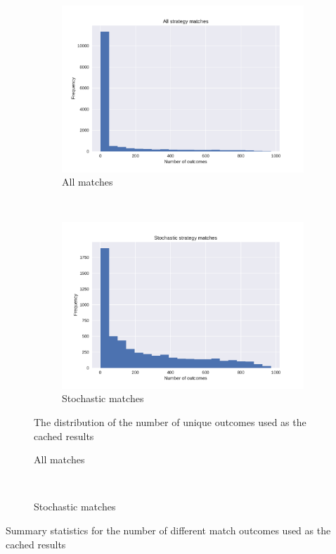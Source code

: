 \documentclass{article}
\begin{document}
\begin{figure}[!hbtp]
    \centering
    \begin{subfigure}[t]{.5\textwidth}
        \centering
        \includegraphics[width=.9\textwidth]{../img/number_of_match_outcomes.pdf}
        \caption{All matches}
    \end{subfigure}%
    ~
    \begin{subfigure}[t]{.5\textwidth}
        \centering
        \includegraphics[width=.9\textwidth]{../img/number_of_stochastic_match_outcomes.pdf}
        \caption{Stochastic matches}
    \end{subfigure}%
    \caption{The distribution of the number of unique outcomes used as the
    cached results}
    \label{fig:number_of_stochastic_match_outcomes}
\end{figure}


\begin{table}[!hbtp]
    \centering
    \begin{subfigure}[t]{.5\textwidth}
        \centering
        
        \caption{All matches}
    \end{subfigure}%
    ~
    \begin{subfigure}[t]{.5\textwidth}
        \centering
        
        \caption{Stochastic matches}
    \end{subfigure}%
    \caption{Summary statistics for the number of different match outcomes used
    as the cached results}
    \label{tbl:number_of_stochastic_match_outcomes}
\end{table}
\end{document}
